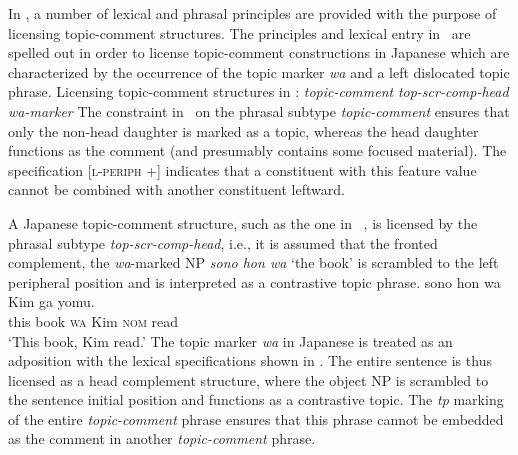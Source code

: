 \documentclass[output=paper
	        ,collection
	        ,collectionchapter
 	        ,biblatex
                ,babelshorthands
                ,newtxmath
                ,draftmode
                ,colorlinks, citecolor=brown
]{langscibook}
\begin{document}
In \cite{song2018}, a number of lexical and phrasal principles are
provided with the purpose of licensing topic-comment structures. The
principles and lexical entry in~ are spelled out
in order to license topic-comment constructions in Japanese which are
characterized by the occurrence of the topic marker \emph{wa} and a
left dislocated topic phrase.
\ea
\label{ex:song-topic}
Licensing topic-comment structures in \cite{song2018}:
\ea
\label{ex:song-topic-a}
\textit{topic-comment}
\impl
{}
  \ex
  \label{ex:song-topic-b}
  \textit{top-scr-comp-head}
\impl
  \ex
  \label{ex:song-topic-c}
  \textit{wa-marker}
\impl
\z
\z
The constraint in~ on the phrasal subtype
\textit{topic-comment} ensures that only the non-head daughter is
marked as a topic, whereas the head daughter functions as the comment
(and presumably contains some focused material). The specification
[\textsc{l-periph} +] indicates that a constituent with this feature
value cannot be combined with another constituent leftward.

A Japanese topic-comment structure, such as the one
in~ \citep[198]{song2018}, is licensed by the phrasal
subtype \textit{top-scr-comp-head}, i.e., it is assumed that the
fronted complement, the \emph{wa}-marked NP \textit{sono hon wa} `the book'
is scrambled to the left peripheral position and is interpreted as a
contrastive topic phrase.
\ea
\label{ex:song-wa}
\gll sono hon wa Kim ga yomu.\\
this book \textsc{wa} Kim \textsc{nom} read \\
\trans `This book, Kim read.'
\z
The topic marker \emph{wa} in Japanese is treated as an adposition with the
lexical specifications shown in . The entire
sentence is thus licensed as a head complement structure, where the
object NP is scrambled to the sentence initial position and functions
as a contrastive topic. The \textit{tp} marking of the entire
\textit{topic-comment} phrase ensures that this phrase cannot be
embedded as the comment in another \textit{topic-comment} phrase.
\end{document}
